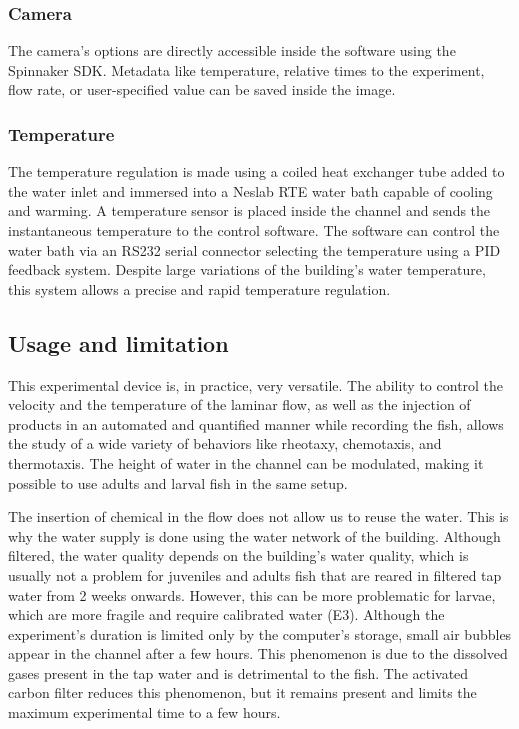   \subsubsection{Camera}
  The camera's options are directly accessible inside the software using the Spinnaker SDK. Metadata like temperature, relative times to the experiment, flow rate, or user-specified value can be saved inside the image.

  \subsubsection{Temperature}
  The temperature regulation is made using a coiled heat exchanger tube added to the water inlet and immersed into a Neslab RTE water bath capable of cooling and warming. A temperature sensor is placed inside the channel and sends the instantaneous temperature to the control software. The software can control the water bath via an RS232 serial connector selecting the temperature using a PID \cite{} feedback system. Despite large variations of the building's water temperature, this system allows a precise and rapid temperature regulation.

  \subsection{Usage and limitation}
  This experimental device is, in practice, very versatile. The ability to control the velocity and the temperature of the laminar flow, as well as the injection of products in an automated and quantified manner while recording the fish, allows the study of a wide variety of behaviors like rheotaxy, chemotaxis, and thermotaxis. The height of water in the channel can be modulated, making it possible to use adults and larval fish in the same setup.

  The insertion of chemical in the flow does not allow us to reuse the water. This is why the water supply is done using the water network of the building. Although filtered, the water quality depends on the building's water quality, which is usually not a problem for juveniles and adults fish that are reared in filtered tap water from 2 weeks onwards. However, this can be more problematic for larvae, which are more fragile and require calibrated water (E3). Although the experiment's duration is limited only by the computer's storage, small air bubbles appear in the channel after a few hours. This phenomenon is due to the dissolved gases present in the tap water and is detrimental to the fish. The activated carbon filter reduces this phenomenon, but it remains present and limits the maximum experimental time to a few hours.


